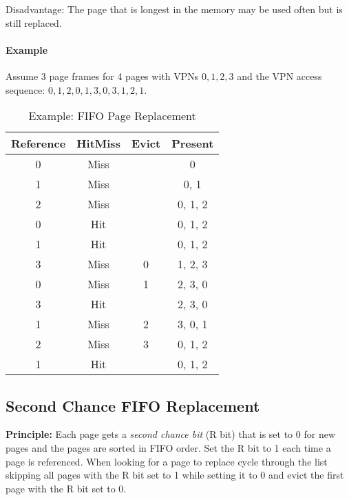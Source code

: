 			Disadvantage: The page that is longest in the memory may be used often but is still replaced.

			\paragraph{Example}
				Assume 3 page frames for 4 pages with VPNs \( 0, 1, 2, 3 \) and the VPN access sequence: \( 0, 1, 2, 0, 1, 3, 0, 3, 1, 2, 1 \).
				\begin{table}[H]
					\centering
					\begin{tabular}{c|c|c|c}
						\textbf{Reference} & \textbf{Hit}\textbf{Miss} & \textbf{Evict} & \textbf{Present} \\ \hline
						0                  & Miss                      &                & 0                \\
						1                  & Miss                      &                & 0, 1             \\
						2                  & Miss                      &                & 0, 1, 2          \\
						0                  & Hit                       &                & 0, 1, 2          \\
						1                  & Hit                       &                & 0, 1, 2          \\
						3                  & Miss                      & 0              & 1, 2, 3          \\
						0                  & Miss                      & 1              & 2, 3, 0          \\
						3                  & Hit                       &                & 2, 3, 0          \\
						1                  & Miss                      & 2              & 3, 0, 1          \\
						2                  & Miss                      & 3              & 0, 1, 2          \\
						1                  & Hit                       &                & 0, 1, 2
					\end{tabular}
					\caption{Example: FIFO Page Replacement}
				\end{table}

		\subsection{Second Chance FIFO Replacement} %
			\textbf{Principle:} Each page gets a \textit{second chance bit} (R bit) that is set to 0 for new pages and the pages are sorted in FIFO order. Set the R bit to 1 each time a page is referenced. When looking for a page to replace cycle through the list skipping all pages with the R bit set to 1 while setting it to 0 and evict the first page with the R bit set to 0.

